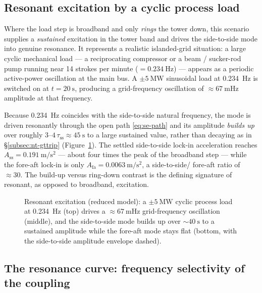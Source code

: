 \subsection{Resonant excitation by a cyclic process load}
\label{subsec:nt-resonance}

Where the load step is broadband and only \emph{rings} the tower down, this
scenario supplies a \emph{sustained} excitation in the tower band and drives the
side-to-side mode into genuine resonance. It represents a realistic islanded-grid
situation: a large cyclic mechanical load --- a reciprocating compressor or a
beam / sucker-rod pump running near 14 strokes per minute
(\(=\SI{0.234}{\hertz}\)) --- appears as a periodic active-power oscillation at
the main bus. A \(\pm\SI{5}{\mega\watt}\) sinusoidal load at \SI{0.234}{\hertz}
is switched on at \(t=\SI{20}{\second}\), producing a grid-frequency oscillation
of \(\approx\SI{67}{\milli\hertz}\) amplitude at that frequency.

Because \SI{0.234}{\hertz} coincides with the side-to-side natural frequency, the
mode is driven resonantly through the open path \eqref{eq:se-path} and its
amplitude \emph{builds up} over roughly \(3\text{--}4\,\tau_{\mathrm{ss}}\approx
\SI{45}{\second}\) to a large sustained value, rather than decaying as in
\S\ref{subsec:nt-gttrip} (Figure~\ref{fig:nt-resonance}). The settled side-to-side
lock-in acceleration reaches
\(A_{\mathrm{ss}} = \SI{0.191}{\metre\per\second\squared}\) --- about four times
the peak of the broadband step --- while the fore-aft lock-in is only
\(A_{\mathrm{fa}} = \SI{0.0063}{\metre\per\second\squared}\), a side-to-side/
fore-aft ratio of \(\approx\!30\). The build-up versus ring-down contrast is the
defining signature of resonant, as opposed to broadband, excitation.

\begin{figure}[t]
  \centering
  \caption{Resonant excitation (reduced model): a \(\pm\SI{5}{\mega\watt}\)
  cyclic process load at \SI{0.234}{\hertz} (top) drives a
  \(\approx\SI{67}{\milli\hertz}\) grid-frequency oscillation (middle), and the
  side-to-side mode builds up over \(\sim\!\SI{40}{\second}\) to a sustained
  amplitude while the fore-aft mode stays flat (bottom, with the side-to-side
  amplitude envelope dashed).}
  \label{fig:nt-resonance}
\end{figure}

\subsection{The resonance curve: frequency selectivity of the coupling}
\label{subsec:nt-curve}


